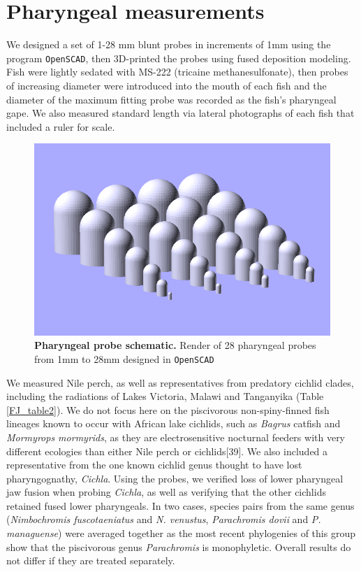 \section{Pharyngeal measurements}

We designed a set of 1-28 mm blunt probes in increments of 1mm using the program {\tt OpenSCAD}, \cite{openscad} then 3D-printed the probes using fused deposition modeling. Fish were lightly sedated with MS-222 (tricaine methanesulfonate), then probes of increasing diameter were introduced into the mouth of each fish and the diameter of the maximum fitting probe was recorded as the fish's pharyngeal gape. We also measured standard length via lateral photographs of each fish that included a ruler for scale. 

\begin{figure}
    \centering
    \includegraphics[width=\textwidth]{FishJaws/figures/fig4}
    \caption{\textbf{Pharyngeal probe schematic.} Render of 28 pharyngeal probes from 1mm to 28mm designed in {\tt OpenSCAD}}
    \label{FJ_fig4}
\end{figure}

We measured Nile perch, as well as representatives from predatory cichlid clades, including the radiations of Lakes Victoria, Malawi and Tanganyika (Table \ref{FJ_table2}). We do not focus here on the piscivorous non-spiny-finned fish lineages known to occur with African lake cichlids, such as {\em Bagrus} catfish and {\em Mormyrops mormyrids}, as they are electrosensitive nocturnal feeders with very different ecologies than either Nile perch or cichlids[39]. We also included a representative from the one known cichlid genus thought to have lost pharyngognathy, {\em Cichla}. \cite{wainwright_evolution_2012} Using the probes, we verified loss of lower pharyngeal jaw fusion when probing {\em Cichla}, as well as verifying that the other cichlids retained fused lower pharyngeals. In two cases, species pairs from the same genus ({\em Nimbochromis fuscotaeniatus} and {\em N. venustus}, {\em Parachromis dovii} and {\em P. managuense}) were averaged together as the most recent phylogenies of this group show that the piscivorous genus {\em Parachromis} is monophyletic. \cite{lopez2013testing} Overall results do not differ if they are treated separately. 

